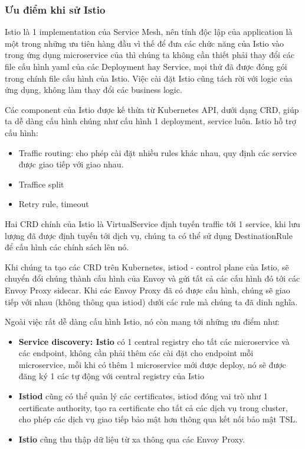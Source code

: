 \documentclass[12pt,a4paper]{report}
\begin{document}
			\subsubsection{Ưu điểm khi sử Istio}
		\hspace{0.6cm}Istio là 1 implementation của Service Mesh, nên tính độc lập của application là một trong những ưu tiên hàng đầu vì thế để đưa các chức năng của Istio vào trong ứng dụng microservice của thì chúng ta không cần thiết phải thay đổi các file cấu hình yaml của các Deployment hay Service, mọi thứ đã được đóng gói trong chính file cấu hình của Istio. Việc cài đặt Istio cũng tách rời với logic của ứng dụng, không làm thay đổi các business logic.
		
		Các component của Istio được kế thừa từ Kubernetes API, dưới dạng CRD, giúp ta dễ dàng cấu hình chúng như cấu hình 1 deployment, service luôn. Istio hỗ trợ cấu hình:
		\begin{itemize}
			\item Traffic routing: cho phép cài đặt nhiều rules khác nhau, quy định các service được giao tiếp với giao nhau.
			\item Traffice split
			\item Retry rule, timeout
		\end{itemize}
		
		Hai CRD chính của Istio là VirtualService định tuyến traffic tới 1 service, khi lưu lượng đã được định tuyến tới dịch vụ, chúng ta có thể sử dụng DestinationRule để cấu hình các chính sách lên nó.
		
		Khi chúng ta tạo các CRD trên Kubernetes, istiod - control plane của Istio, sẽ chuyển đổi chúng thành cấu hình của Envoy và gửi tất cả các cấu hình đó tới các Envoy Proxy sidecar. Khi các Envoy Proxy đã có được cấu hình, chúng sẽ giao tiếp với nhau (không thông qua istiod) dưới các rule mà chúng ta đã dinh nghĩa.
		
		Ngoài việc rất dễ dàng cấu hình Istio, nó còn mang tới những ưu điểm như:
		\begin{itemize}
			\item \textbf{Service discovery: Istio} có 1 central registry cho tất các microservice và các endpoint, không cần phải thêm các cài đặt cho endpoint mỗi microservice, mỗi khi có thêm 1 microservice mới được deploy, nó sẽ được đăng ký 1 các tự động với central registry của Istio
			\item \textbf{Istiod} cũng có thể quản lý các certificates, istiod đóng vai trò như 1 certificate authority, tạo ra certificate cho tất cả các dịch vụ trong cluster, cho phép các dịch vụ giao tiếp bảo mật hơn thông qua kết nối bảo mật TSL.
			\item \textbf{Istio} cũng thu thập dữ liệu từ xa thông qua các Envoy Proxy.
		\end{itemize}
		
\end{document}
